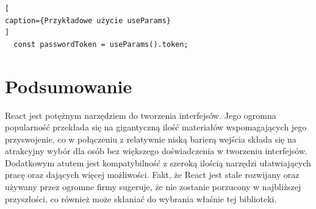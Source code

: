 \documentclass[oneside,polski,logo,indent]{amuthesis}
\begin{document}
\begin{lstlisting}[
caption={Przykładowe użycie useParams}
]
  const passwordToken = useParams().token;

\end{lstlisting}


\section{Podsumowanie}
React jest potężnym narzędziem do tworzenia interfejsów. Jego ogromna popularność przekłada się na gigantyczną ilość materiałów wspomagających jego przyswojenie, co w połączeniu z relatywnie niską barierą wejścia składa się na atrakcyjny wybór dla osób bez większego doświadczenia w tworzeniu interfejsów.
Dodatkowym atutem jest kompatybilność z szeroką ilością narzędzi ułatwiających pracę oraz dających więcej możliwości. Fakt, że React jest stale rozwijany oraz używany przez ogromne firmy
sugeruje, że nie zostanie porzucony w najbliższej przyszłości, co również może skłaniać do wybrania właśnie tej biblioteki.

\nocite{*}


\printbibliography
\end{document}
